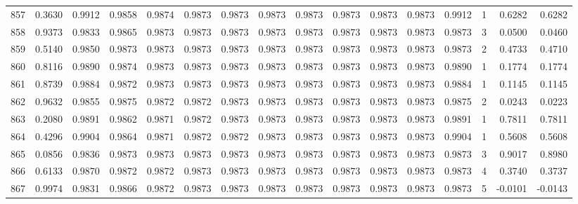 \begin{tabular}{lrrrrrrrrrrrrrrr}
857 &      0.3630 &  0.9912 &  0.9858 &  0.9874 &  0.9873 &  0.9873 &  0.9873 &  0.9873 &  0.9873 &  0.9873 &   0.9873 &     0.9912 &      1 &                    0.6282 &                     0.6282 \\
858 &      0.9373 &  0.9833 &  0.9865 &  0.9873 &  0.9873 &  0.9873 &  0.9873 &  0.9873 &  0.9873 &  0.9873 &   0.9873 &     0.9873 &      3 &                    0.0500 &                     0.0460 \\
859 &      0.5140 &  0.9850 &  0.9873 &  0.9873 &  0.9873 &  0.9873 &  0.9873 &  0.9873 &  0.9873 &  0.9873 &   0.9873 &     0.9873 &      2 &                    0.4733 &                     0.4710 \\
860 &      0.8116 &  0.9890 &  0.9874 &  0.9873 &  0.9873 &  0.9873 &  0.9873 &  0.9873 &  0.9873 &  0.9873 &   0.9873 &     0.9890 &      1 &                    0.1774 &                     0.1774 \\
861 &      0.8739 &  0.9884 &  0.9872 &  0.9873 &  0.9873 &  0.9873 &  0.9873 &  0.9873 &  0.9873 &  0.9873 &   0.9873 &     0.9884 &      1 &                    0.1145 &                     0.1145 \\
862 &      0.9632 &  0.9855 &  0.9875 &  0.9872 &  0.9872 &  0.9873 &  0.9873 &  0.9873 &  0.9873 &  0.9873 &   0.9873 &     0.9875 &      2 &                    0.0243 &                     0.0223 \\
863 &      0.2080 &  0.9891 &  0.9862 &  0.9871 &  0.9872 &  0.9873 &  0.9873 &  0.9873 &  0.9873 &  0.9873 &   0.9873 &     0.9891 &      1 &                    0.7811 &                     0.7811 \\
864 &      0.4296 &  0.9904 &  0.9864 &  0.9871 &  0.9872 &  0.9872 &  0.9873 &  0.9873 &  0.9873 &  0.9873 &   0.9873 &     0.9904 &      1 &                    0.5608 &                     0.5608 \\
865 &      0.0856 &  0.9836 &  0.9873 &  0.9873 &  0.9873 &  0.9873 &  0.9873 &  0.9873 &  0.9873 &  0.9873 &   0.9873 &     0.9873 &      3 &                    0.9017 &                     0.8980 \\
866 &      0.6133 &  0.9870 &  0.9872 &  0.9872 &  0.9873 &  0.9873 &  0.9873 &  0.9873 &  0.9873 &  0.9873 &   0.9873 &     0.9873 &      4 &                    0.3740 &                     0.3737 \\
867 &      0.9974 &  0.9831 &  0.9866 &  0.9872 &  0.9873 &  0.9873 &  0.9873 &  0.9873 &  0.9873 &  0.9873 &   0.9873 &     0.9873 &      5 &                   -0.0101 &                    -0.0143 \\

\end{tabular}
